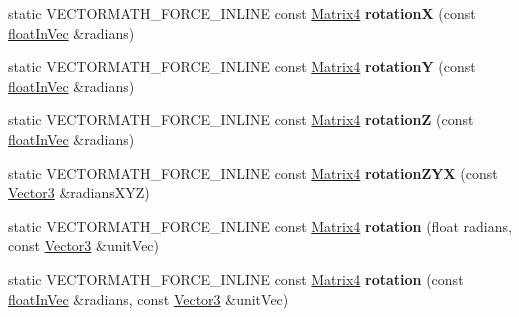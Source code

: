 \begin{DoxyCompactItemize}
static V\+E\+C\+T\+O\+R\+M\+A\+T\+H\+\_\+\+F\+O\+R\+C\+E\+\_\+\+I\+N\+L\+I\+NE const \hyperlink{classVectormath_1_1Aos_1_1Matrix4}{Matrix4} {\bfseries rotationX} (const \hyperlink{classVectormath_1_1floatInVec}{float\+In\+Vec} \&radians)
\item 
\mbox{\label{classVectormath_1_1Aos_1_1Matrix4_aa8f239c26efb748f577a222e49cf20f2}} 
static V\+E\+C\+T\+O\+R\+M\+A\+T\+H\+\_\+\+F\+O\+R\+C\+E\+\_\+\+I\+N\+L\+I\+NE const \hyperlink{classVectormath_1_1Aos_1_1Matrix4}{Matrix4} {\bfseries rotationY} (const \hyperlink{classVectormath_1_1floatInVec}{float\+In\+Vec} \&radians)
\item 
\mbox{\label{classVectormath_1_1Aos_1_1Matrix4_aeb6cd286d97d11a96a7f6f6c8a4c9f35}} 
static V\+E\+C\+T\+O\+R\+M\+A\+T\+H\+\_\+\+F\+O\+R\+C\+E\+\_\+\+I\+N\+L\+I\+NE const \hyperlink{classVectormath_1_1Aos_1_1Matrix4}{Matrix4} {\bfseries rotationZ} (const \hyperlink{classVectormath_1_1floatInVec}{float\+In\+Vec} \&radians)
\item 
\mbox{\label{classVectormath_1_1Aos_1_1Matrix4_a7fa9c305f8fdb0bd26bf536cbdd5040f}} 
static V\+E\+C\+T\+O\+R\+M\+A\+T\+H\+\_\+\+F\+O\+R\+C\+E\+\_\+\+I\+N\+L\+I\+NE const \hyperlink{classVectormath_1_1Aos_1_1Matrix4}{Matrix4} {\bfseries rotation\+Z\+YX} (const \hyperlink{classVectormath_1_1Aos_1_1Vector3}{Vector3} \&radians\+X\+YZ)
\item 
\mbox{\label{classVectormath_1_1Aos_1_1Matrix4_a9ca83ed9445fff0adf8c87ed8453ce58}} 
static V\+E\+C\+T\+O\+R\+M\+A\+T\+H\+\_\+\+F\+O\+R\+C\+E\+\_\+\+I\+N\+L\+I\+NE const \hyperlink{classVectormath_1_1Aos_1_1Matrix4}{Matrix4} {\bfseries rotation} (float radians, const \hyperlink{classVectormath_1_1Aos_1_1Vector3}{Vector3} \&unit\+Vec)
\item 
\mbox{\label{classVectormath_1_1Aos_1_1Matrix4_af9a3d6a45ed9758e8b39858853e8522f}} 
static V\+E\+C\+T\+O\+R\+M\+A\+T\+H\+\_\+\+F\+O\+R\+C\+E\+\_\+\+I\+N\+L\+I\+NE const \hyperlink{classVectormath_1_1Aos_1_1Matrix4}{Matrix4} {\bfseries rotation} (const \hyperlink{classVectormath_1_1floatInVec}{float\+In\+Vec} \&radians, const \hyperlink{classVectormath_1_1Aos_1_1Vector3}{Vector3} \&unit\+Vec)
\item 

\end{DoxyCompactItemize}
